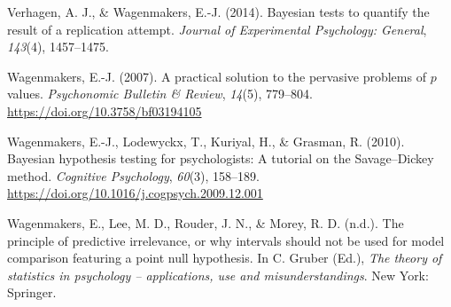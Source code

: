 \documentclass[english,,doc,floatsintext]{apa6}
\begin{document}
\leavevmode\hypertarget{ref-verhagen14bayesian}{}%
Verhagen, A. J., \& Wagenmakers, E.-J. (2014). Bayesian tests to quantify the result of a replication attempt. \emph{Journal of Experimental Psychology: General}, \emph{143}(4), 1457--1475.

\leavevmode\hypertarget{ref-wagenmakers2007}{}%
Wagenmakers, E.-J. (2007). A practical solution to the pervasive problems of \(p\) values. \emph{Psychonomic Bulletin \& Review}, \emph{14}(5), 779--804. \url{https://doi.org/10.3758/bf03194105}

\leavevmode\hypertarget{ref-wagenmakers2010}{}%
Wagenmakers, E.-J., Lodewyckx, T., Kuriyal, H., \& Grasman, R. (2010). Bayesian hypothesis testing for psychologists: A tutorial on the Savage--Dickey method. \emph{Cognitive Psychology}, \emph{60}(3), 158--189. \url{https://doi.org/10.1016/j.cogpsych.2009.12.001}

\leavevmode\hypertarget{ref-WagenmakersEtAlPredictiveIrrelevancesubm}{}%
Wagenmakers, E., Lee, M. D., Rouder, J. N., \& Morey, R. D. (n.d.). The principle of predictive irrelevance, or why intervals should not be used for model comparison featuring a point null hypothesis. In C. Gruber (Ed.), \emph{The theory of statistics in psychology -- applications, use and misunderstandings}. New York: Springer.
\end{document}
